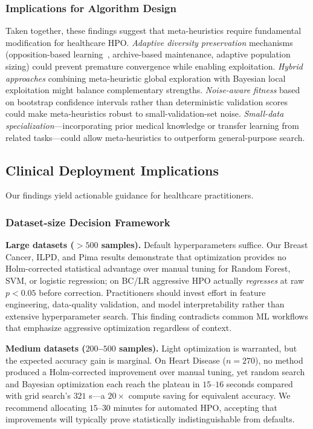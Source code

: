 \documentclass[letterpaper, 10 pt, conference]{ieeeconf}
\begin{document}
\subsubsection{Implications for Algorithm Design}

Taken together, these findings suggest that meta-heuristics require fundamental modification for healthcare HPO. \emph{Adaptive diversity preservation} mechanisms (opposition-based learning~\cite{tizhoosh2005}, archive-based maintenance, adaptive population sizing) could prevent premature convergence while enabling exploitation. \emph{Hybrid approaches} combining meta-heuristic global exploration with Bayesian local exploitation might balance complementary strengths. \emph{Noise-aware fitness} based on bootstrap confidence intervals rather than deterministic validation scores could make meta-heuristics robust to small-validation-set noise. \emph{Small-data specialization}---incorporating prior medical knowledge or transfer learning from related tasks---could allow meta-heuristics to outperform general-purpose search.

\subsection{Clinical Deployment Implications}

Our findings yield actionable guidance for healthcare practitioners.

\subsubsection{Dataset-size Decision Framework}

\textbf{Large datasets ($>500$ samples).} Default hyperparameters suffice. Our Breast Cancer, ILPD, and Pima results demonstrate that optimization provides no Holm-corrected statistical advantage over manual tuning for Random Forest, SVM, or logistic regression; on BC/LR aggressive HPO actually \emph{regresses} at raw $p < 0.05$ before correction. Practitioners should invest effort in feature engineering, data-quality validation, and model interpretability rather than extensive hyperparameter search. This finding contradicts common ML workflows that emphasize aggressive optimization regardless of context.

\textbf{Medium datasets ($200$--$500$ samples).} Light optimization is warranted, but the expected accuracy gain is marginal. On Heart Disease ($n = 270$), no method produced a Holm-corrected improvement over manual tuning, yet random search and Bayesian optimization each reach the plateau in $15$--$16$ seconds compared with grid search's $321$ s---a $20\times$ compute saving for equivalent accuracy. We recommend allocating $15$--$30$ minutes for automated HPO, accepting that improvements will typically prove statistically indistinguishable from defaults.
\end{document}
